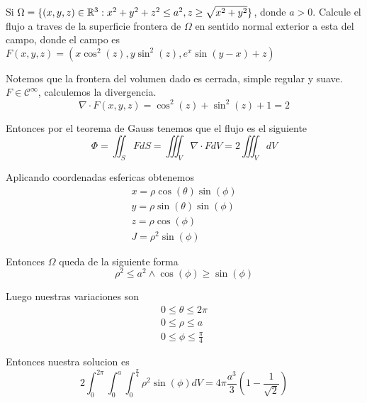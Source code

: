 \message{ !name(MAT024.tex)}\documentclass[../main.tex]{subfiles}
\begin{document}
\begin{problem}
Si $\Omega = \{(x, y, z) \in \mathbb{R}^{3} : x^{2} + y^{2} + z^{2} \leq a^{2}, z \geq \sqrt{x^{2} + y^{2}}\}$, donde $a > 0$. Calcule el flujo a traves de la superficie frontera de $\Omega$ en sentido normal exterior a esta del campo, donde el campo es $F(x, y, z) = (x \cos^{2}(z), y \sin^{2}(z), e^{x}\sin(y - x) + z)$
\end{problem}
\begin{solution}
Notemos que la frontera del volumen dado es cerrada, simple regular y suave. $F \in \mathcal{C}^{\infty}$, calculemos la divergencia.
\begin{equation*}
\nabla \cdot F(x, y, z) = \cos^{2}(z) + \sin^{2}(z) + 1 = 2
\end{equation*}

Entonces por el teorema de Gauss tenemos que el flujo es el siguiente
\begin{equation*}
\Phi = \iint_{S} F dS = \iiint_{V} \nabla \cdot F dV = 2 \iiint_{V} dV
\end{equation*}

Aplicando coordenadas esfericas obtenemos
\begin{gather*}
  x = \rho \cos(\theta) \sin(\phi)\\
  y = \rho \sin(\theta) \sin(\phi)\\
  z = \rho \cos(\phi)\\
  J = \rho^{2} \sin(\phi)
\end{gather*}

Entonces $\Omega$ queda de la siguiente forma
\begin{equation*}
  \rho^{2} \leq a^{2} \land \cos(\phi) \geq \sin(\phi)
\end{equation*}

Luego nuestras variaciones son
\begin{gather*}
  0 \leq \theta \leq 2\pi\\
  0 \leq \rho \leq a\\
  0 \leq \phi \leq \frac{\pi}{4}
\end{gather*}

Entonces nuestra solucion es
\begin{equation*}
2 \int_{0}^{2\pi}\int_{0}^{a}\int_{0}^{\frac{\pi}{4}} \rho^{2} \sin(\phi) dV = 4\pi \frac{a^{3}}{3} (1 - \frac{1}{\sqrt{2}})
\end{equation*}
\end{solution}
\end{document}
